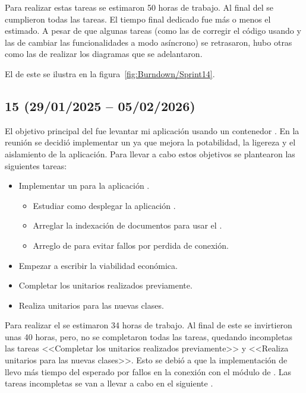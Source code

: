 Para realizar estas tareas se estimaron 50 horas de trabajo. Al final del  se cumplieron todas las tareas. El tiempo final dedicado fue más o menos el estimado. A pesar de que algunas tareas (como las de corregir el código usando  y las de cambiar las funcionalidades a modo asíncrono) se retrasaron, hubo otras como las de realizar los diagramas que se adelantaron.

El  de este  se ilustra en la figura~\ref{fig:Burndown/Sprint14}.

\subsection{ 15 (29/01/2025 -- 05/02/2026)}
El objetivo principal del  fue levantar mi aplicación  usando un contenedor . En la reunión se decidió implementar un  ya que mejora la potabilidad, la ligereza y el aislamiento de la aplicación. Para llevar a cabo estos objetivos se plantearon las siguientes tareas:
\begin{itemize}
\tightlist
	\item Implementar un  para la aplicación .
	\begin{itemize}
	\tightlist
		\item Estudiar como desplegar la aplicación .
		\item Arreglar la indexación de documentos para usar el .
		\item Arreglo de  para evitar fallos por perdida de conexión.
	\end{itemize}
	\item Empezar a escribir la viabilidad económica.
	\item Completar los  unitarios realizados previamente.
	\item Realiza  unitarios para las nuevas clases.
\end{itemize}

Para realizar el  se estimaron 34 horas de trabajo. Al final de este  se invirtieron unas 40 horas, pero, no se completaron todas las tareas, quedando incompletas las tareas <<Completar los  unitarios realizados previamente>> y <<Realiza  unitarios para las nuevas clases>>. Esto se debió a que la implementación de  llevo más tiempo del esperado por fallos en la conexión con el módulo de . Las tareas incompletas se van a llevar a cabo en el siguiente .


